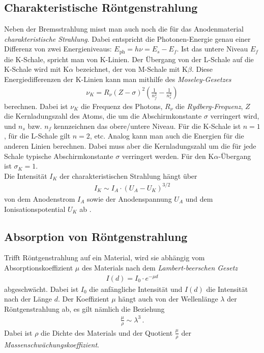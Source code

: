 \documentclass[12pt,a4paper,titlepage,headinclude,bibtotoc]{scrartcl}
\begin{document}
\subsection{Charakteristische Röntgenstrahlung}
Neben der Bremsstrahlung misst man auch noch die für das Anodenmaterial \emph{charakteristische Strahlung}.
Dabei entspricht die Photonen-Energie genau einer Differenz von zwei Energieniveaus: $E_\text{ph}=h\nu=E_s-E_f$.
Ist das untere Niveau $E_f$ die K-Schale, spricht man von K-Linien.
Der Übergang von der L-Schale auf die K-Schale wird mit K$\alpha$ bezeichnet, der von M-Schale mit K$\beta$.
Diese Energiedifferenzen der K-Linien kann man mithilfe des \emph{Moseley-Gesetzes} \cite[S.836f]{gerthsen}
\begin{align}
	\nu_K=R_\nu (Z-\sigma)^2\left(\frac{1}{n_f^2}-\frac{1}{n_s^2}\right)
	\label{eq:moseley}
\end{align}
berechnen.
Dabei ist $\nu_K$ die Frequenz des Photons, $R_\nu$ die \emph{Rydberg-Frequenz}, $Z$ die Kernladungszahl des Atoms, die um die Abschirmkonstante $\sigma$ verringert wird, und $n_s$ bzw. $n_f$ kennzeichnen das obere/untere Niveau.
Für die K-Schale ist $n=1$, für die L-Schale gilt $n=2$, etc.
Analog kann man auch die Energien für die anderen Linien berechnen.
Dabei muss aber die Kernladungszahl um die für jede Schale typische Abschirmkonstante $\sigma$ verringert werden.
Für den K$\alpha$-Übergang ist $\sigma_K=1$.\\

Die Intensität $I_K$ der charakteristischen Strahlung hängt über
\begin{align}
	I_K \sim I_A\cdot(U_A-U_K)^{3/2}
	\label{eq:IntChara}
\end{align}
von dem Anodenstrom $I_A$ sowie der Anodenspannung $U_A$ und dem Ionisationspotential $U_K$ ab \cite[S.207]{prakti}.

\subsection{Absorption von Röntgenstrahlung}
Trifft Röntgenstrahlung auf ein Material, wird sie abhängig vom Absorptionskoeffizient $\mu$ des Materials nach dem \emph{Lambert-beerschen Gesetz} \cite[S.838ff]{gerthsen}
\begin{align}
	I(d)=I_0\cdot e^{-\mu d}
	\label{eq:absorption}
\end{align}
abgeschwächt.
Dabei ist $I_0$ die anfängliche Intensität und $I(d)$ die Intensität nach der Länge $d$.
Der Koeffizient $\mu$ hängt auch von der Wellenlänge $\lambda$ der Röntgenstrahlung ab, es gilt nämlich die Beziehung 
\begin{align}
	\frac{\mu}{\rho}\sim\lambda^3\,.
	\label{eq:abs_koeff(lambda)}
\end{align}
Dabei ist $\rho$ die Dichte des Materials und der Quotient $\frac{\mu}{\rho}$ der \emph{Massenschwächungskoeffizient}.
\end{document}
